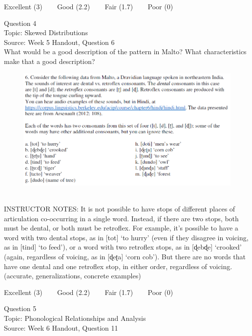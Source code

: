 \documentclass[12pt]{article}
\begin{document}
\vfill
Excellent (3) ~~~ Good (2.2) ~~~ Fair (1.7) ~~~ Poor (0)
\newpage

{\large Question 4}\\

Topic: Skewed Distributions\\
Source: Week 5 Handout, Question 6\\

What would be a good description of the pattern in Malto? What characteristics make that a good description?\\

\begin{figure}[H]
\includegraphics{../images/malto.png}
\end{figure}

~\\
INSTRUCTOR NOTES: It is not possible to have stops of different places of articulation co-occurring in a single word. Instead, if there are two stops, both must be dental, or both must be retroflex. For example, it’s possible to have a word with two dental stops, as in [tot] ‘to hurry’ (even if they disagree in voicing, as in [tind] ‘to feed’), or a word with two retroflex stops, as in [ɖebɖe] ‘crooked’ (again, regardless of voicing, as in [ɖeʈa] ‘corn cob’). But there are no words that have one dental and one retroflex stop, in either order, regardless of voicing. (accurate, generalizations, concrete examples)


\vfill
Excellent (3) ~~~ Good (2.2) ~~~ Fair (1.7) ~~~ Poor (0)
\newpage

{\large Question 5}\\

Topic: Phonological Relationships and Analysis\\
Source: Week 6 Handout, Question 11\\
\end{document}

